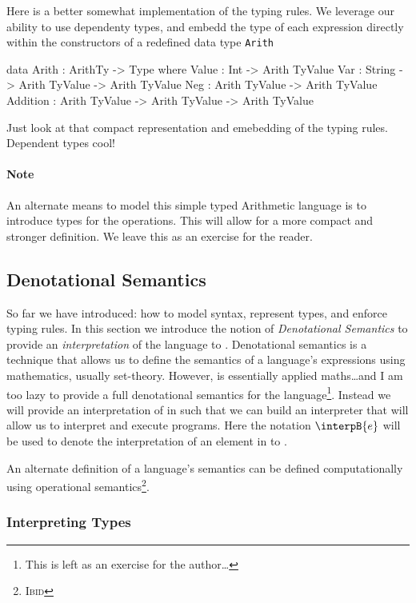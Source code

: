 Here is a better somewhat implementation of the typing rules.
We leverage our ability to use dependenty types, and embedd the type of each expression directly within the constructors of a redefined data type \texttt{Arith}

\begin{code}
data Arith : ArithTy -> Type where
  Value    : Int                            -> Arith TyValue
  Var      : String        -> Arith TyValue -> Arith TyValue
  Neg      : Arith TyValue                  -> Arith TyValue
  Addition : Arith TyValue -> Arith TyValue -> Arith TyValue
\end{code}

\noindent
Just look at that compact representation and emebedding of the typing rules.
Dependent types cool!


\paragraph{Note}
An alternate means to model this simple typed Arithmetic language is to introduce types for the operations.
This will allow for a more compact and stronger definition.
We leave this as an exercise for the reader.

\subsection{Denotational Semantics}
\label{sec:typed-arith:semantics}

So far we have introduced: how to model syntax, represent types, and enforce typing rules.
In this section we introduce the notion of \emph{Denotational Semantics} to provide an \emph{interpretation} of the language to \idris{}.
Denotational semantics is a technique that allows us to define the semantics of a language's expressions using mathematics, usually set-theory.
However, \idris{} is essentially applied maths\ldots and I am too lazy to provide a full denotational semantics for the language\footnote{This is left as an exercise for the author\ldots}.
Instead  we will provide an interpretation of in \idris{} such that we can build an interpreter that will allow us to interpret and execute programs.
Here the notation $\interpB{e}$ will be used to denote the interpretation of an element in \allang{} to \idris{}.

An alternate definition of a language's semantics can be defined computationally using operational semantics\footnote{\textsc{Ibid}}.

\subsubsection{Interpreting Types}
\label{sec:typed-arith:semantics:types}

